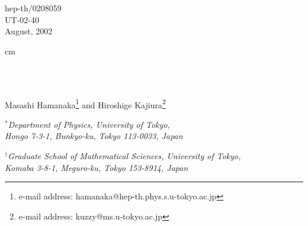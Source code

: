 \documentclass[a4paper,epsf,12pt]{article}
\begin{document}
\begin{titlepage}
\thispagestyle{empty}
\begin{flushright}
hep-th/0208059\\
UT-02-40\\
August, 2002 \\
\end{flushright}

 cm

\begin{center}
\\
\noindent{
 }\\
\renewcommand{\thefootnote}{\fnsymbol{footnote}}

\vskip 2cm

{\large Masashi Hamanaka\footnote{e-mail address:
    hamanaka@hep-th.phys.s.u-tokyo.ac.jp} and 
    Hiroshige Kajiura\footnote{e-mail address:
    kuzzy@ms.u-tokyo.ac.jp}}%
\vspace{15mm}


${}^{*}${\it Department of Physics, University of Tokyo,\\ 
Hongo 7-3-1, Bunkyo-ku, Tokyo 113-0033, Japan}

\vspace{6mm}

${}^{\dag}${\it Graduate School of Mathematical Sciences, 
University of Tokyo,\\
Komaba 3-8-1, Meguro-ku, Tokyo 153-8914, Japan}

\vskip 1.5cm
\end{center}
\begin{abstract}
We discuss gauge fields on tori in diverse dimensions, 
mainly in two and four dimensions.
We construct various explicit gauge fields which have
some topological charges
and find the Dirac zero modes in the background
of the gauge fields.
By using the zero mode,
we give new gauge fields on the dual torus,
which is a gauge theoretical description of T-duality 
transformation of the corresponding D-brane systems
including D\=D systems. 
{}From the transformation,
we can easily see the duality 
expected from the index theorem. 
It is also mentioned that, for each topological charges, the 
corresponding constant curvature bundle can be constructed 
and their duality transformation can be performed 
in terms of Heisenberg modules. 

\end{abstract}
\vfill
 
\end{titlepage}
\vfill
\setcounter{footnote}{0}
\renewcommand{\thefootnote}{\arabic{footnote}}
\newpage
\end{document}
